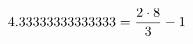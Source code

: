 \documentclass[preview]{standalone}
\begin{document}
\begin{align*}
\special{dvisvgm:raw <g id='unique000'>}4.33333333333333 = \frac{2 \cdot 8}{3}-1\special{dvisvgm:raw </g>}
\end{align*}
\end{document}
